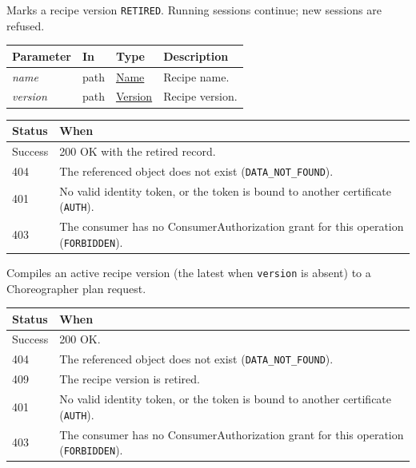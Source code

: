 \documentclass[a4paper]{arrowhead}
\newcommand{\fparam}[1]{\textit{\textcolor{ArrowheadBlue}{#1}}}
\newcommand{\pref}[1]{{\textcolor{ArrowheadGrey}{\hyperref[sec:model:primitives:#1]{#1}}}}
\begin{document}
Marks a recipe version \texttt{RETIRED}. Running sessions continue; new sessions are refused.

{\small
\begin{longtable}{|p{3.0cm}|p{1.4cm}|p{3.2cm}|p{8.2cm}|}

\hline
\rowcolor{gray!33} Parameter & In & Type & Description \\ \hline
\endhead
\fparam{name} & path & \pref{Name} & Recipe name. \\ \hline
\fparam{version} & path & \pref{Version} & Recipe version. \\ \hline
\end{longtable}
}


{\small
\begin{longtable}{|p{2.0cm}|p{13.8cm}|}

\hline
\rowcolor{gray!33} Status & When \\ \hline
\endhead
Success & 200 OK with the retired record. \\ \hline
404 & The referenced object does not exist (\texttt{DATA\_NOT\_FOUND}). \\ \hline
401 & No valid identity token, or the token is bound to another certificate (\texttt{AUTH}). \\ \hline
403 & The consumer has no ConsumerAuthorization grant for this operation (\texttt{FORBIDDEN}). \\ \hline
\end{longtable}
}

Compiles an active recipe version (the latest when \texttt{version} is absent) to a Choreographer plan request.

{\small
\begin{longtable}{|p{2.0cm}|p{13.8cm}|}

\hline
\rowcolor{gray!33} Status & When \\ \hline
\endhead
Success & 200 OK. \\ \hline
404 & The referenced object does not exist (\texttt{DATA\_NOT\_FOUND}). \\ \hline
409 & The recipe version is retired. \\ \hline
401 & No valid identity token, or the token is bound to another certificate (\texttt{AUTH}). \\ \hline
403 & The consumer has no ConsumerAuthorization grant for this operation (\texttt{FORBIDDEN}). \\ \hline
\end{longtable}
}
\end{document}
